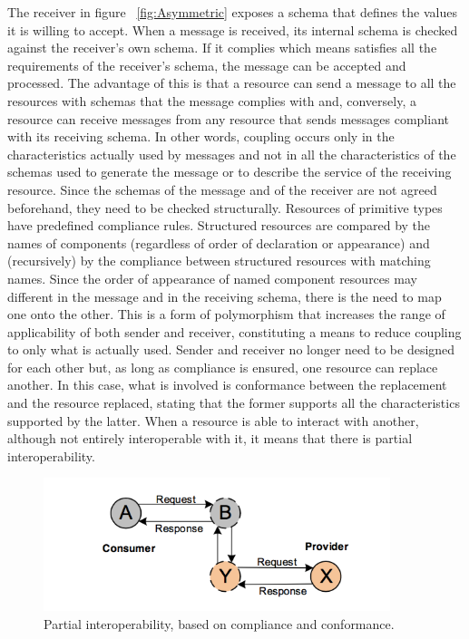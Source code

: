 The receiver in figure ~\ref{fig:Asymmetric} exposes a schema that defines the values it is willing to accept.
When a message is received, its internal schema is checked against the receiver’s own schema. If it complies which means satisfies all the requirements of the receiver’s schema, the message can be accepted and processed. The advantage of this is that a resource can send a message to all the resources with schemas that the message complies with and, conversely, a resource can receive messages from any resource that sends messages compliant with its receiving schema. In other words, coupling occurs only in the characteristics actually used by messages and not in all the characteristics of the schemas used to generate the message or to describe the service of the receiving resource. Since the schemas of the message and of the receiver are not agreed beforehand, they need to be checked structurally. Resources of primitive types have predefined compliance rules. Structured resources are compared by the names of components (regardless of order of declaration or appearance) and (recursively) by the compliance between structured resources with matching names. Since the order of appearance of named component resources may different in the message and in the receiving schema, there is the need to map one onto the other. This is a form of polymorphism that increases the range of applicability of both sender and receiver, constituting a means to reduce coupling to only what is actually used. Sender and receiver no longer need to be designed for each other but, as long as compliance is ensured, one resource can replace another. In this case, what is involved is conformance between the replacement and the resource replaced, stating that the former supports all the characteristics supported by the latter. When a resource is able to interact with another, although not entirely interoperable with it, it means that there is partial interoperability.

\begin{figure}[!htb]
 \centering
 \includegraphics[width=0.9\textwidth]{Figures/partial.png}
 \caption[Partial interoperability, based on compliance and conformance.]{Partial interoperability, based on compliance and conformance.}
 \label{fig:Partial}
\end{figure}


